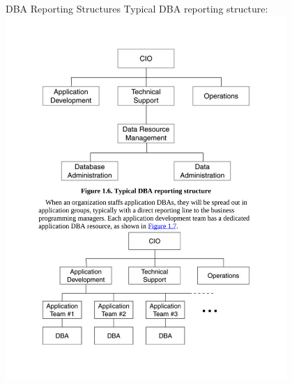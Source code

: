 \documentclass{beamer}
\begin{document}
\begin{frame}{DBA Reporting Structures}
    Typical DBA reporting structure:\\
    \vspace{5mm}
    \centering
    \includegraphics[width=0.8\textwidth, trim={2.55cm 14.80cm 2.55cm 2.50cm}, clip]{figures/dba_reporting1}
\end{frame}
\end{document}
